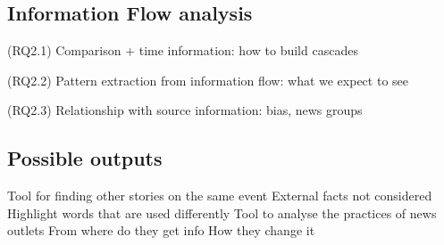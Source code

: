 \subsection{Information Flow analysis}

(RQ2.1) Comparison + time information: how to build cascades

(RQ2.2) Pattern extraction from information flow: what we expect to see

(RQ2.3) Relationship with source information: bias, news groups


\subsection{Possible outputs}


Tool for finding other stories on the same event
External facts not considered
Highlight words that are used differently
Tool to analyse the practices of news outlets
From where do they get info
How they change it
